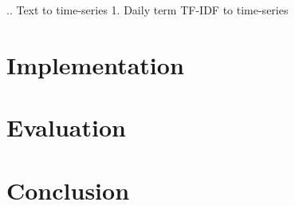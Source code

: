 \documentclass{article}
\begin{document}
.. Text to time-series
1. Daily term TF-IDF to time-series
\section{Implementation}
\section{Evaluation}
\section{Conclusion}

\end{document}
